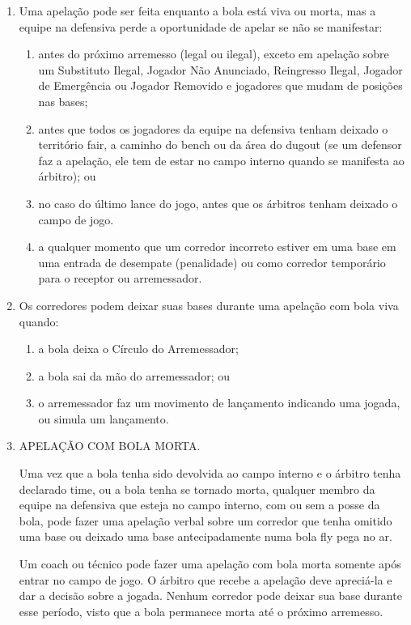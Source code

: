 \begin{enumerate}[label=(\alph*)]
	\item Uma apelação pode ser feita enquanto a bola está viva ou morta, mas a equipe na defensiva perde a oportunidade de apelar se não se manifestar:
	\begin{enumerate}[label=\roman*.]
		\item antes do próximo arremesso (legal ou ilegal), exceto em apelação sobre um Substituto Ilegal, Jogador Não Anunciado, Reingresso Ilegal, Jogador de Emergência ou Jogador Removido e jogadores que mudam de posições nas bases;
		\item  antes que todos os jogadores da equipe na defensiva tenham deixado o território \gls{fair}, a caminho do \gls{bench} ou da área do \gls{dugout} (se um defensor faz a apelação, ele tem de estar no campo interno quando se manifesta ao árbitro); ou
		\item no caso do último lance do jogo, antes que os árbitros tenham deixado o campo de jogo.
		\item a qualquer momento que um corredor incorreto estiver em uma base em uma  entrada de desempate (penalidade) ou como corredor temporário para o receptor ou arremessador.
	\end{enumerate}
	\item Os corredores podem deixar suas bases durante uma apelação com bola viva  quando:
	\begin{enumerate}[label=\roman*.]
		\item a bola deixa o Círculo do Arremessador;
		\item a bola sai da mão do arremessador; ou
		\item o arremessador faz um movimento de lançamento indicando uma jogada, ou simula um lançamento.
	\end{enumerate}
	\item  APELAÇÃO COM BOLA MORTA.

	Uma vez que a bola tenha sido devolvida  ao campo interno e o árbitro tenha declarado \gls{time}, ou a bola tenha se tornado morta, qualquer membro da equipe na defensiva que esteja no campo interno, com ou sem a posse da bola, pode fazer uma apelação verbal sobre um corredor que tenha omitido uma base ou deixado uma base antecipadamente numa bola  \gls{fly} pega no ar.

	Um \gls{coach} ou técnico pode fazer uma apelação com bola morta  somente após entrar no campo de jogo. O árbitro que recebe a apelação deve apreciá-la e dar a decisão sobre a jogada. Nenhum corredor pode deixar sua base durante esse período, visto que a bola permanece morta até o próximo arremesso.


\end{enumerate}
